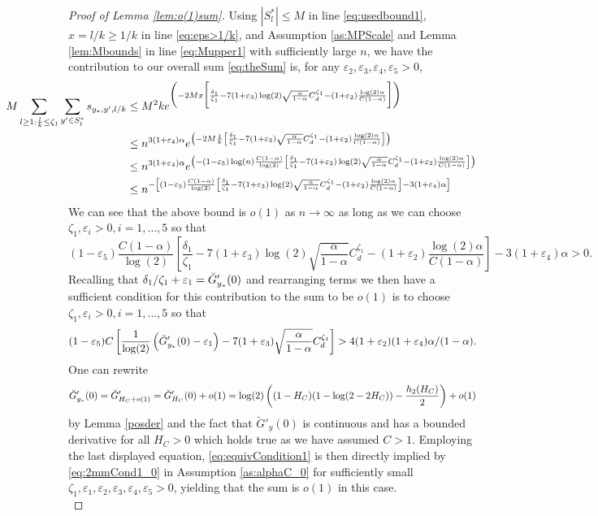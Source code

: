 \documentclass[12pt,reqno]{amsart}
\numberwithin{equation}{section}
\theoremstyle{definition}
\renewcommand{\epsilon}{\varepsilon}
\newcommand{\conv}[1]{\overset{#1}{\rightarrow}}
\renewcommand{\[}{\begin{equation}}
\renewcommand{\]}{\end{equation}}
\renewcommand{\|}{\bigg{|}}
\begin{document}
\begin{proof}[Proof of Lemma \ref{lem:o(1)sum}]
    Using $|S^*_l| \leq M$ in line \eqref{eq:usedbound1}, $x = l/k \geq 1/k$ in line \eqref{eq:eps>1/k}, and Assumption \ref{as:MPScale} and Lemma \ref{lem:Mbounds} in line \eqref{eq:Mupper1} with sufficiently large $n$, we have the contribution to our overall sum \eqref{eq:theSum} is, for any $\epsilon_2, \epsilon_3, \epsilon_4, \epsilon_5 > 0$,
    \begin{align}\hspace{-2cm}
    M \sum_{l\geq 1:\frac{l}{k}\leq\zeta_1}\sum_{y' \in S^*_l}s_{y_*, y', l/k}
        &\leq M^2ke^{\bigg{(}-2Mx\bigg{[}\frac{\delta_1}{\zeta_1}- 7(1+\epsilon_3)\log(2)\sqrt{\frac{\alpha}{1-\alpha}}C_d^{\zeta_1}  - (1+\epsilon_2)\frac{\log(2)\alpha}{C(1-\alpha)}\bigg{]}\bigg{)} }\label{eq:usedbound1}\\
        &\leq n^{3(1+\epsilon_4)\alpha}e^{\left(-2M\frac{1}{k}\left[\frac{\delta_1}{\zeta_1}- 7(1+\epsilon_3)\sqrt{\frac{\alpha}{1-\alpha}}C_d^{\zeta_1} - (1+\epsilon_2)\frac{\log(2)\alpha}{C(1-\alpha)}\right]\right)}\label{eq:eps>1/k}\\
    \label{eq:Mupper1}&\leq n^{3(1+\epsilon_4)\alpha}e^{\left(-(1-\epsilon_5)\log(n)\frac{C(1-\alpha)}{\log(2)}\left[\frac{\delta_1}{\zeta_1}- 7(1+\epsilon_3)\log(2)\sqrt{\frac{\alpha}{1-\alpha}}C_d^{\zeta_1} - (1 + \epsilon_2)\frac{\log(2)\alpha}{C(1-\alpha)}\right]\right)}\\
    &\leq n^{-\left[(1-\epsilon_5)\frac{C(1-\alpha)}{\log(2)}\left[\frac{\delta_1}{\zeta_1}- 7(1+\epsilon_3)\log(2)\sqrt{\frac{\alpha}{1-\alpha}}C_d^{\zeta_1} - (1+\epsilon_2)\frac{\log(2)\alpha}{C(1-\alpha)}\right] - 3(1+\epsilon_4)\alpha\right]}\\
    \end{align}
    We can see that the above bound is $o(1)$ as $n \conv{} \infty$ as long as we can choose $\zeta_1,\epsilon_i>0, i=1,\ldots,5$ so that
    \[(1-\epsilon_5)\frac{C(1-\alpha)}{\log(2)}\left[\frac{\delta_1}{\zeta_1}- 7(1+\epsilon_3)\log(2)\sqrt{\frac{\alpha}{1-\alpha}}C_d^{\zeta_1} - (1+\epsilon_2)\frac{\log(2)\alpha}{C(1-\alpha)}\right] - 3(1+\epsilon_4)\alpha > 0.\]
    Recalling that $\delta_1 / \zeta_1 +\epsilon_1 = \Breve{G}_{y_*}'(0)$ and rearranging terms we then have a sufficient condition for this contribution to the sum to be $o(1)$ is to choose $\zeta_1,\epsilon_i>0, i=1,\ldots,5$ so that
    \[(1-\epsilon_5)C\left[\frac{1}{\log(2)}\left(\Breve{G}_{y_*}'(0) - \epsilon_1\right)- 7(1+\epsilon_3)\sqrt{\frac{\alpha}{1-\alpha}}C_d^{\zeta_1}\right]> 4(1+\epsilon_2)(1+\epsilon_4)\alpha/(1-\alpha).\label{eq:equivCondition1}\]
One can rewrite 
    \[\Breve{G}'_{y_*}(0) = \Breve{G}'_{H_C + o(1)} = \Breve{G}'_{H_C}(0) + o(1) = \log(2)\left((1-H_C)(1-\log(2-2H_C)) - \frac{h_2(H_C)}{2}\right) + o(1)\] by Lemma \ref{posder} and the fact that $\breve{G}'_y(0)$ is continuous and has a bounded derivative for all $H_C > 0$ which holds true as we have assumed $C > 1$. Employing the last displayed equation, \eqref{eq:equivCondition1} is then directly implied by \eqref{eq:2mmCond1_0} in Assumption \ref{as:alphaC_0} for sufficiently small $\zeta_1, \epsilon_1, \epsilon_2, \epsilon_3, \epsilon_4, \epsilon_5 > 0$, yielding that the sum is $o(1)$ in this case.\hfill\\


\end{proof}
\end{document}
